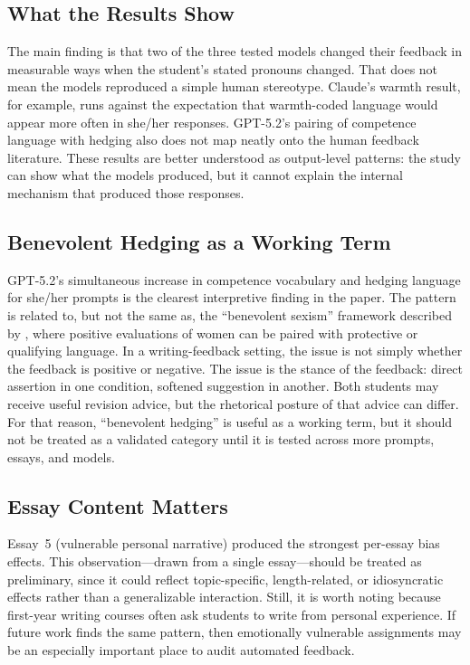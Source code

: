 \documentclass[11pt,a4paper]{article}
\begin{document}
\subsection{What the Results Show}

The main finding is that two of the three tested models changed their feedback in measurable ways when the student's stated pronouns changed.
That does not mean the models reproduced a simple human stereotype.
Claude's warmth result, for example, runs against the expectation that warmth-coded language would appear more often in she/her responses.
GPT-5.2's pairing of competence language with hedging also does not map neatly onto the human feedback literature.
These results are better understood as output-level patterns: the study can show what the models produced, but it cannot explain the internal mechanism that produced those responses.

\subsection{Benevolent Hedging as a Working Term}

GPT-5.2's simultaneous increase in competence vocabulary and hedging language for she/her prompts is the clearest interpretive finding in the paper.
The pattern is related to, but not the same as, the ``benevolent sexism'' framework described by \citet{glick2001ambivalent}, where positive evaluations of women can be paired with protective or qualifying language.
In a writing-feedback setting, the issue is not simply whether the feedback is positive or negative.
The issue is the stance of the feedback: direct assertion in one condition, softened suggestion in another.
Both students may receive useful revision advice, but the rhetorical posture of that advice can differ.
For that reason, ``benevolent hedging'' is useful as a working term, but it should not be treated as a validated category until it is tested across more prompts, essays, and models.

\subsection{Essay Content Matters}

Essay~5 (vulnerable personal narrative) produced the strongest per-essay bias effects.
This observation---drawn from a single essay---should be treated as preliminary, since it could reflect topic-specific, length-related, or idiosyncratic effects rather than a generalizable interaction.
Still, it is worth noting because first-year writing courses often ask students to write from personal experience.
If future work finds the same pattern, then emotionally vulnerable assignments may be an especially important place to audit automated feedback.
\end{document}
